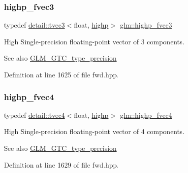 \subsubsection{\texorpdfstring{highp\+\_\+fvec3}{highp\_fvec3}}
{\footnotesize\ttfamily typedef \hyperlink{structglm_1_1detail_1_1tvec3}{detail\+::tvec3}$<$float, \hyperlink{namespaceglm_a0f04f086094c747d227af4425893f545ac6f7eab42eacbb10d59a58e95e362074}{highp}$>$ \hyperlink{group__gtc__type__precision_ga79b821fc8ae989b12bb43e2cd3932580}{glm\+::highp\+\_\+fvec3}}

High Single-\/precision floating-\/point vector of 3 components. \begin{DoxySeeAlso}{See also}
\hyperlink{group__gtc__type__precision}{G\+L\+M\+\_\+\+G\+T\+C\+\_\+type\+\_\+precision} 
\end{DoxySeeAlso}


Definition at line 1625 of file fwd.\+hpp.

\mbox{\label{group__gtc__type__precision_gae0de2413648d89bf5a8e598e5520a439}} 
\subsubsection{\texorpdfstring{highp\+\_\+fvec4}{highp\_fvec4}}
{\footnotesize\ttfamily typedef \hyperlink{structglm_1_1detail_1_1tvec4}{detail\+::tvec4}$<$float, \hyperlink{namespaceglm_a0f04f086094c747d227af4425893f545ac6f7eab42eacbb10d59a58e95e362074}{highp}$>$ \hyperlink{group__gtc__type__precision_gae0de2413648d89bf5a8e598e5520a439}{glm\+::highp\+\_\+fvec4}}

High Single-\/precision floating-\/point vector of 4 components. \begin{DoxySeeAlso}{See also}
\hyperlink{group__gtc__type__precision}{G\+L\+M\+\_\+\+G\+T\+C\+\_\+type\+\_\+precision} 
\end{DoxySeeAlso}


Definition at line 1629 of file fwd.\+hpp.

\mbox{\label{group__gtc__type__precision_gaa04399853952dbce29cb62e2432f350a}} 
